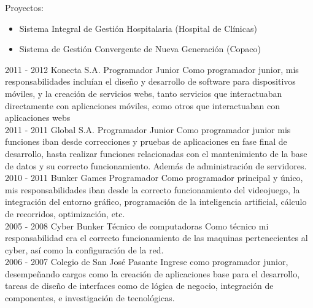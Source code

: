 \documentclass[]{friggeri-cv}
\begin{document}
\begin{entrylist}
{        Proyectos:
        \begin{itemize}
            \item Sistema Integral de Gestión Hospitalaria (Hospital de
                Clínicas)
            \item Sistema de Gestión Convergente de Nueva Generación (Copaco)
        \end{itemize}}
\entry
    {2011 - 2012}
    {Konecta S.A.}
    {Programador Junior}
    {Como programador junior, mis responsabilidades incluían el diseño y
        desarrollo de software para dispositivos móviles, y la creación de
        servicios webs, tanto servicios que interactuaban directamente con
        aplicaciones móviles, como otros que interactuaban con aplicaciones webs
        \\}
\entry
    {2011 - 2011}
    {Global S.A.}
    {Programador Junior}
    {Como programador junior mis funciones iban desde correcciones y pruebas de
        aplicaciones en fase final de desarrollo, hasta realizar funciones
        relacionadas con el mantenimiento de la base de datos y su correcto
        funcionamiento. Además de administración de servidores. \\}
\entry
    {2010 - 2011}
    {Bunker Games}
    {Programador}
    {Como programador principal y único, mis responsabilidades iban desde la
        correcto funcionamiento del videojuego, la integración del entorno
        gráfico, programación de la inteligencia artificial, cálculo de
        recorridos, optimización, etc. \\}
\entry
    {2005 - 2008}
    {Cyber Bunker}
    {Técnico de computadoras}
    {Como técnico mi responsabilidad era el correcto funcionamiento de las
        maquinas pertenecientes al cyber, así como la configuración de la red.
        \\}
\entry
    {2006 - 2007}
    {Colegio de San José}
    {Pasante}
    {Ingrese como programador junior, desempeñando cargos como la
creación de aplicaciones base para el desarrollo, tareas de diseño de
interfaces como de lógica de negocio, integración de componentes, e
investigación de tecnológicas. \\}

\end{entrylist}
\end{document}
